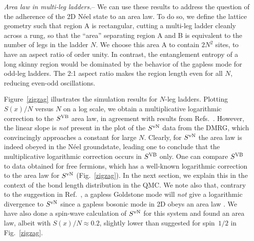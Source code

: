 \documentclass[prl,aps,twocolumn,floatfix,amsmath,amssymb,superscriptaddress,tightenlines]{revtex4}
\begin{document}
 
{\it Area law in multi-leg ladders.}--  
We can use these results to address the question of the adherence of the 2D N\'eel state
to an area law.  To do so, we
define the lattice
geometry such that region A is rectangular, cutting a multi-leg ladder
cleanly across a rung, so that the ``area'' separating region A and B is
equivalent to the number of legs in the ladder $N$.  We choose this area A
to contain $2N^2$ sites, to have an aspect ratio of order unity.  In
contrast, the entanglement entropy of a long
skinny region would be dominated by the behavior
of the gapless mode for odd-leg ladders.
The 2:1 aspect ratio makes the region length even for all $N$, reducing even-odd oscillations.

Figure~\ref{zigzag} illustrates the simulation results for $N$-leg ladders.
Plotting $S(x)/N$ versus $N$ on a log scale, we obtain a
multiplicative logarithmic correction to the $S^{\rm VB}$ area law, in agreement
with results from Refs.~\cite{Alet,Chh}.  However, the linear slope is {\it not} present in
the plot of the $S^{ \rm vN}$ data from the DMRG, which convincingly approaches a
constant for large $N$.  Clearly, for $S^{ \rm vN}$ the area law is
indeed obeyed in the N\'eel groundstate, leading one to conclude that the
multiplicative logarithmic correction occurs in $S^{\rm VB}$ only.  One can
compare $S^{\rm VB}$ to data obtained for free fermions, which has a well-known \cite{2dfermion} logarithmic correction to the area law for $S^{ \rm vN}$ (Fig.~\ref{zigzag}).
In the next section, we explain this 
in the context of the bond length distribution in the QMC.
We note also that, contrary to the suggestion in Ref.~\cite{Alet}, a gapless Goldstone mode will {\it not} give a logarithmic
divergence to $S^{ \rm vN}$ since a gapless bosonic mode in 2D
obeys an area law \cite{2dboson}.  We have also done a spin-wave calculation of
$S^{\rm vN}$ for this system and found an area law, albeit with
$S(x)/N\approx 0.2$, slightly lower than suggested for spin~$1/2$ in Fig.~\ref{zigzag}.
\end{document}
